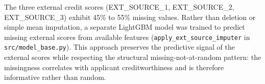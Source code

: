 \documentclass[11pt, a4paper]{article}
\begin{document}
The three external credit scores (EXT\_SOURCE\_1, EXT\_SOURCE\_2, EXT\_SOURCE\_3) exhibit 45\% to 55\% missing values. Rather than deletion or simple mean imputation, a separate LightGBM model was trained to predict missing external scores from available features (\texttt{apply\_ext\_source\_imputer} in \texttt{src/model\_base.py}). This approach preserves the predictive signal of the external scores while respecting the structural missing-not-at-random pattern: the missingness correlates with applicant creditworthiness and is therefore informative rather than random.

\printbibliography
\end{document}
